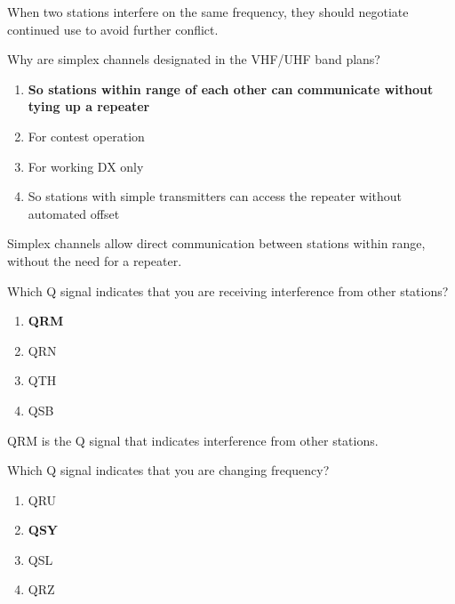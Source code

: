 When two stations interfere on the same frequency, they should negotiate continued use to avoid further conflict.

\begin{tcolorbox}[colback=gray!10!white,colframe=black!75!black,title={T2B09}]
    Why are simplex channels designated in the VHF/UHF band plans?
    \begin{enumerate}[label=\Alph*),noitemsep]
        \item \textbf{So stations within range of each other can communicate without tying up a repeater}
        \item For contest operation
        \item For working DX only
        \item So stations with simple transmitters can access the repeater without automated offset
    \end{enumerate}
\end{tcolorbox}

Simplex channels allow direct communication between stations within range, without the need for a repeater.

\begin{tcolorbox}[colback=gray!10!white,colframe=black!75!black,title={T2B10}]
    Which Q signal indicates that you are receiving interference from other stations?
    \begin{enumerate}[label=\Alph*),noitemsep]
        \item \textbf{QRM}
        \item QRN
        \item QTH
        \item QSB
    \end{enumerate}
\end{tcolorbox}

QRM is the Q signal that indicates interference from other stations.

\begin{tcolorbox}[colback=gray!10!white,colframe=black!75!black,title={T2B11}]
    Which Q signal indicates that you are changing frequency?
    \begin{enumerate}[label=\Alph*),noitemsep]
        \item QRU
        \item \textbf{QSY}
        \item QSL
        \item QRZ
    \end{enumerate}
\end{tcolorbox}


